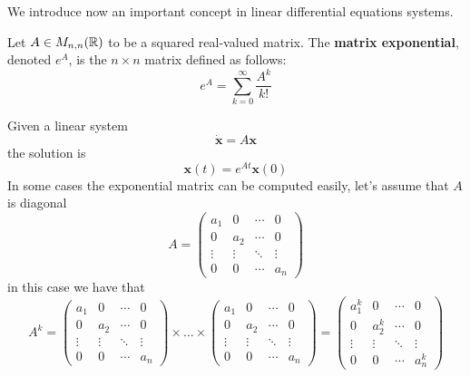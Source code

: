 \documentclass[10pt, letterpaper]{report}
\begin{document}
\noindent We introduce now an important concept in linear differential equations systems.\begin{definition}
    Let $A\in M_{n,n}({\mathbb R})$ to be a squared real-valued matrix. The \textbf{matrix exponential}, denoted $e^A$, is the $n\times n$ matrix defined as follows:\begin{equation}
        e^A=\sum_{k=0}^\infty\frac{A^k}{k!}
    \end{equation}
\end{definition}
Given a linear system\begin{equation}
    \dot{\mathbf x}=A\mathbf x
\end{equation}
the solution is\begin{equation}
    \mathbf x(t)=e^{At}\mathbf x(0)
\end{equation}
In some cases the exponential matrix can be computed easily, let's assume that $A$ is diagonal\begin{equation}
    A=\begin{pmatrix}
a_1 & 0 & \cdots & 0 \\
0 & a_2 & \cdots & 0 \\
\vdots & \vdots & \ddots & \vdots \\
0 & 0 & \cdots & a_n
\end{pmatrix}
\end{equation}
in this case we have that\begin{equation}
    A^k=\begin{pmatrix}
a_1 & 0 & \cdots & 0 \\
0 & a_2 & \cdots & 0 \\
\vdots & \vdots & \ddots & \vdots \\
0 & 0 & \cdots & a_n
\end{pmatrix}\times  \dots \times \begin{pmatrix}
a_1 & 0 & \cdots & 0 \\
0 & a_2 & \cdots & 0 \\
\vdots & \vdots & \ddots & \vdots \\
0 & 0 & \cdots & a_n
\end{pmatrix} = \begin{pmatrix}
a_1^k & 0 & \cdots & 0 \\
0 & a_2^k & \cdots & 0 \\
\vdots & \vdots & \ddots & \vdots \\
0 & 0 & \cdots & a_n^k
\end{pmatrix}
\end{equation}
\end{document}
